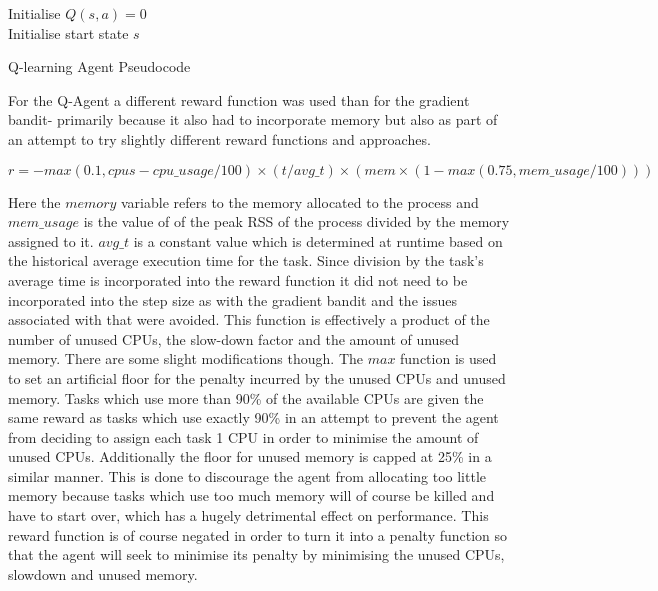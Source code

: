 \begin{algorithm}[H]
Initialise $Q(s,a) = 0$\\
Initialise start state $s$\\
\caption{Q-learning Agent Pseudocode}
\label{alg:q-learning}
\end{algorithm}


For the Q-Agent a different reward function was used than for the gradient bandit- primarily because it also had to incorporate memory but also as part of an attempt to try slightly different reward functions and approaches. 

\begin{equation}\label{q_agent_1_reward}
r = -max(0.1,cpus-cpu\_usage/100) \times (t/avg\_t) \times (mem\times (1 - max(0.75,mem\_usage/100)))
\end{equation}

Here the $memory$ variable refers to the memory allocated to the process and $mem\_usage$ is the value of of the peak RSS of the process divided by the memory assigned to it. $avg\_t$ is a constant value which is determined at runtime based on the historical average execution time for the task. Since division by the task’s average time is incorporated into the reward function it did not need to be incorporated into the step size as with the gradient bandit and the issues associated with that were avoided. This function is effectively a product of the number of unused CPUs, the slow-down factor and the amount of unused memory. There are some slight modifications though. The $max$ function is used to set an artificial floor for the penalty incurred by the unused CPUs and unused memory. Tasks which use more than 90\% of the available CPUs are given the same reward as tasks which use exactly 90\% in an attempt to prevent the agent from deciding to assign each task 1 CPU in order to minimise the amount of unused CPUs. Additionally the floor for unused memory is capped at 25\% in a similar manner. This is done to discourage the agent from allocating too little memory because tasks which use too much memory will of course be killed and have to start over, which has a hugely detrimental effect on performance. This reward function is of course negated in order to turn it into a penalty function so that the agent will seek to minimise its penalty by minimising the unused CPUs, slowdown and unused memory.

